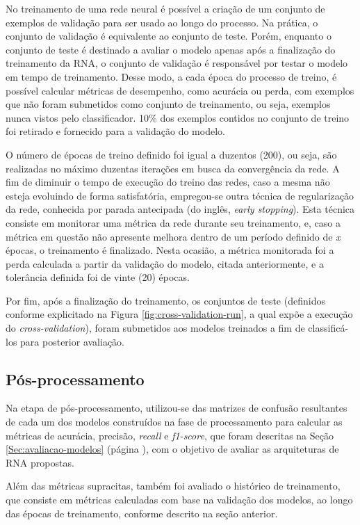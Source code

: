 No treinamento de uma rede neural é possível a criação de um conjunto de exemplos de validação para ser usado ao longo do processo. Na prática, o conjunto de validação é equivalente ao conjunto de teste. Porém, enquanto o conjunto de teste é destinado a avaliar o modelo apenas após a finalização do treinamento da RNA, o conjunto de validação é responsável por testar o modelo em tempo de treinamento. Desse modo, a cada época do processo de treino, é possível calcular métricas de desempenho, como acurácia ou perda, com exemplos que não foram submetidos como conjunto de treinamento, ou seja, exemplos nunca vistos pelo classificador. 10\% dos exemplos contidos no conjunto de treino foi retirado e fornecido para a validação do modelo.

O número de épocas de treino definido foi igual a duzentos (200), ou seja, são realizadas no máximo duzentas iterações em busca da convergência da rede. A fim de diminuir o tempo de execução do treino das redes, caso a mesma não esteja evoluindo de forma satisfatória, empregou-se outra técnica de regularização da rede, conhecida por parada antecipada (do inglês, \textit{early stopping}). Esta técnica consiste em monitorar uma métrica da rede durante seu treinamento, e, caso a métrica em questão não apresente melhora dentro de um período definido de \emph{x} épocas, o treinamento é finalizado. Nesta ocasião, a métrica monitorada foi a perda calculada a partir da validação do modelo, citada anteriormente, e a tolerância definida foi de vinte (20) épocas.

Por fim, após a finalização do treinamento, os conjuntos de teste (definidos conforme explicitado na Figura \ref{fig:cross-validation-run}, a qual expõe a execução do \textit{cross-validation}), foram submetidos aos modelos treinados a fim de classificá-los para posterior avaliação.

\subsection{Pós-processamento}

Na etapa de pós-processamento, utilizou-se das matrizes de confusão resultantes de cada um dos modelos construídos na fase de processamento para calcular as métricas de acurácia, precisão, \textit{recall} e \textit{f1-score}, que foram descritas na Seção \ref{Sec:avaliacao-modelos} (página \pageref{Sec:avaliacao-modelos}), com o objetivo de avaliar as arquiteturas de RNA propostas.

Além das métricas supracitas, também foi avaliado o histórico de treinamento, que consiste em métricas calculadas com base na validação dos modelos, ao longo das épocas de treinamento, conforme descrito na seção anterior.